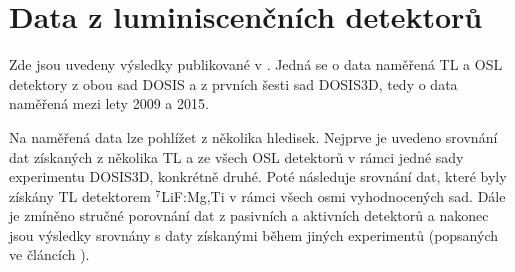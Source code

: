 \section{Data z luminiscenčních detektorů}\label{sec:dosis_vysledky}
Zde jsou uvedeny výsledky publikované v \cite{dosis}. Jedná se o data naměřená TL a OSL detektory z obou sad DOSIS a z prvních šesti sad DOSIS3D, tedy o data naměřená mezi lety 2009 a 2015. %

Na naměřená data lze pohlížet z několika hledisek. Nejprve je uvedeno srovnání dat získaných z několika TL a ze všech OSL detektorů v rámci jedné sady experimentu DOSIS3D, konkrétně druhé. Poté následuje srovnání dat, které byly získány TL detektorem $^7$LiF:Mg,Ti v rámci všech osmi vyhodnocených sad. Dále je zmíněno stručné porovnání dat z pasivních a aktivních detektorů a nakonec jsou výsledky srovnány s daty získanými během jiných experimentů (popsaných ve článcích \cite{japonsky,passDetectors, ambrozova_dvaExperimenty, pille, pille2}).
